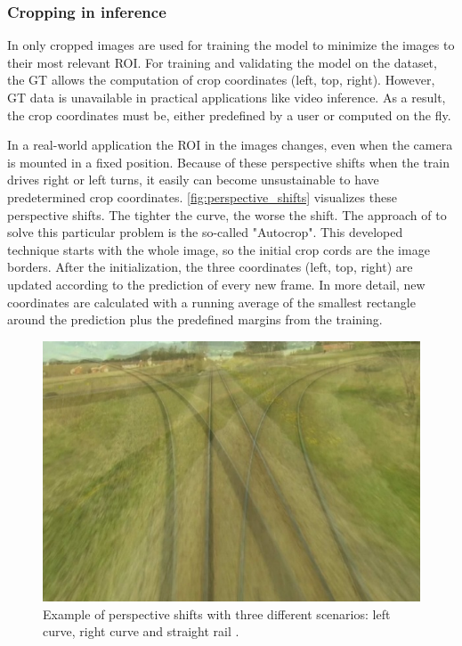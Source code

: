 \subsubsection{Cropping in inference}

In \cite{tepNet2024} only cropped images are used for training the model to minimize the images to their most relevant \ac{ROI}.
For training and validating the model on the dataset, the \ac{GT} allows the computation of crop coordinates (left, top, right).
However, \ac{GT} data is unavailable in practical applications like video inference.
As a result, the crop coordinates must be, either predefined by a user or computed on the fly.

In a real-world application the ROI in the images changes, even when the camera is mounted in a fixed position.
Because of these perspective shifts when the train drives right or left turns, it easily can become unsustainable to have predetermined crop coordinates.
\autoref{fig:perspective_shifts} visualizes these perspective shifts.
The tighter the curve, the worse the shift.
The approach of \cite{tepNet2024} to solve this particular problem is the so-called "Autocrop".
This developed technique starts with the whole image, so the initial crop cords are the image borders.
After the initialization, the three coordinates (left, top, right) are updated according to the prediction of every new frame.
In more detail, new coordinates are calculated with a running average of the smallest rectangle around the prediction plus the predefined margins from the training.

\begin{figure}[H]
    \centering
    \includegraphics[width=\linewidth]{PICs/Baselinepaper/perspective_shifts.jpg}
    \caption{Example of perspective shifts with three different scenarios: left curve, right curve and straight rail \cite{tepNet2024}.}
    \label{fig:perspective_shifts}
\end{figure}

